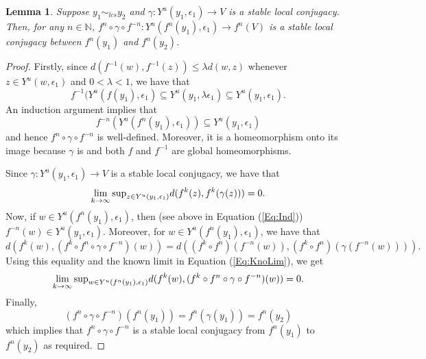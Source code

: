 \documentclass{amsart}
\newcommand{\N}{\mathbb{N}}
\theoremstyle{plain}
\newtheorem{lemma}[theorem]{Lemma}
\theoremstyle{definition}
\theoremstyle{remark}
\begin{document}
\begin{lemma} \label{lem:locConIt}
Suppose $y_1 \sim_{lcs} y_2$ and $\gamma : Y^u(y_1, \epsilon_1) \rightarrow V$ is a stable local conjugacy. Then, for any $n\in \N$, $f^n \circ \gamma \circ f^{-n} : Y^u( f^n(y_1), \epsilon_1) \rightarrow f^n(V)$ is a stable local conjugacy between $f^n(y_1)$ and $f^n(y_2)$.
\end{lemma}
\begin{proof}
Firstly, since $d(f^{-1}(w), f^{-1}(z)) \leq \lambda d(w,z)$ whenever $z\in Y^u(w, \epsilon_1)$ and $0<\lambda<1$, we have that
\[
f^{-1}(Y^u(f(y_1), \epsilon_1) \subseteq Y^u(y_1, \lambda\epsilon_1) \subseteq Y^u(y_1, \epsilon_1).
\]
An induction argument implies that 
\begin{equation} \label{Eq:Ind}
 f^{-n}(Y^u(f^n(y_1), \epsilon_1)) \subseteq Y^u(y_1, \epsilon_1) 
\end{equation}
and hence $f^n \circ \gamma \circ f^{-n}$ is well-defined. Moreover, it is a homeomorphism onto its image because $\gamma$ is and both $f$ and $f^{-1}$ are global homeomorphisms.

Since $\gamma : Y^u(y_1, \epsilon_1) \rightarrow V$ is a stable local conjugacy, we have that
\begin{equation} \label{Eq:KnoLim} \lim_{k \rightarrow \infty} {\rm sup}_{z \in Y^u(y_1, \epsilon_1)} d( f^k(z), f^k(\gamma(z)))=0.
\end{equation}
Now, if $w \in Y^u(f^n(y_1), \epsilon_1)$, then (see above in Equation (\ref{Eq:Ind})) $f^{-n}(w)\in Y^u(y_1, \epsilon_1)$. Moreover, for $w \in Y^u(f^n(y_1), \epsilon_1)$, we have that
\[
 d( f^k(w), (f^k\circ f^n\circ \gamma\circ f^{-n})(w))  = d( (f^k\circ f^n)(f^{-n}(w)), (f^k\circ f^n)( \gamma(f^{-n}(w)))). \]
Using this equality and the known limit in Equation (\ref{Eq:KnoLim}), we get  
\[  \lim_{k \rightarrow \infty} {\rm sup}_{w \in Y^u(f^n(y_1), \epsilon_1)}  d( f^k(w), (f^k\circ f^n\circ \gamma\circ f^{-n})(w)) =0. \]
Finally, 
\[ (f^n \circ \gamma \circ f^{-n})(f^n(y_1))=f^n (\gamma(y_1))=f^n(y_2) \]
which implies that $f^n \circ \gamma \circ f^{-n}$ is a stable local conjugacy from $f^n(y_1)$ to $f^n(y_2)$ as required.
\end{proof}
\end{document}
